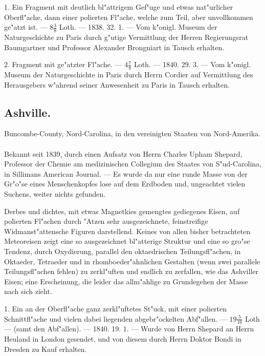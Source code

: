 \documentclass[a4paper, 11pt, oneside, polutonikogreek, german]{article}
\begin{document}
1. Ein Fragment mit deutlich bl"attrigem Gef"uge und etwas nat"urlicher Oberfl"ache, dann einer polierten Fl"ache, welche zum Teil, aber unvollkommen ge"atzt ist. --- $8\frac{3}{8}$ Loth. --- 1838. 32. 1. --- Vom k"onigl. Museum der Naturgeschichte zu Paris durch g"utige Vermittlung der Herren Regierungsrat Baumgartner und Professor Alexander Brongniart in Tausch erhalten.

2. Fragment mit ge"atzter Fl"ache. --- $4\frac{7}{8}$ Loth. --- 1840. 29. 3. --- Vom k"onigl. Museum der Naturgeschichte in Paris durch Herrn Cordier auf Vermittlung des Herausgebers w"ahrend seiner Anwesenheit zu Paris in Tausch erhalten.
\subsection{Ashville.}
\begin{center}
\small
Buncombe-County, Nord-Carolina, in den vereinigten Staaten von Nord-Amerika.
\end{center}
\paragraph{}
Bekannt seit 1839, durch einen Aufsatz von Herrn Charles Upham Shepard, Professor der Chemie am medizinischen Collegium des Staates von S"ud-Carolina, in Sillimans American Journal. --- Es wurde da nur eine runde Masse von der Gr"o"se eines Menschenkopfes lose auf dem Erdboden und, ungeachtet vielen Suchens, weiter nichts gefunden.

Derbes und dichtes, mit etwas Magnetkies gemengtes gediegenes Eisen, auf polierten Fl"achen durch "Atzen sehr ausgezeichnete, feinstreifige Widmanst"attensche Figuren darstellend. Keines von allen bisher betrachteten Meteoreisen zeigt eine so ausgezeichnet bl"atterige Struktur und eine so gro"se Tendenz, durch Oxydierung, parallel den oktaedrischen Teilungsfl"achen, in Oktaeder, Tetraeder und in rhomboeder"ahnlichen Gestalten (wenn zwei parallele Teilungsfl"achen fehlen) zu zerkl"uften und endlich zu zerfallen, wie das Ashviller Eisen; eine Erscheinung, die leider das allm"ahlige zu Grundegehen der Masse nach sich zieht.

1. Ein an der Oberfl"ache ganz zerkl"uftetes St"uck, mit einer polierten Schnittfl"ache und vielen dabei liegenden abgebr"ockelten Abf"allen. --- $19\frac{5}{16}$ Loth --- (samt den Abf"allen). --- 1840. 19. 1. --- Wurde von Herrn Shepard an Herrn Heuland in London gesendet, und von diesem durch Herrn Doktor Bondi in Dresden zu Kauf erhalten.
\end{document}
